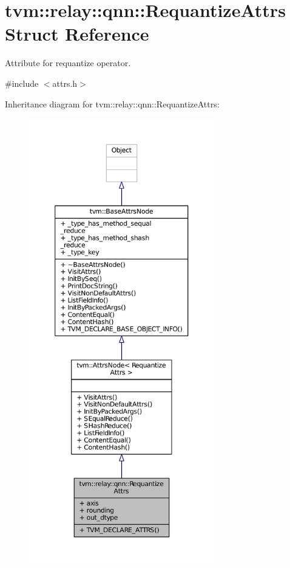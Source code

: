 \hypertarget{structtvm_1_1relay_1_1qnn_1_1RequantizeAttrs}{}\section{tvm\+:\+:relay\+:\+:qnn\+:\+:Requantize\+Attrs Struct Reference}
\label{structtvm_1_1relay_1_1qnn_1_1RequantizeAttrs}


Attribute for requantize operator.  




{\ttfamily \#include $<$attrs.\+h$>$}



Inheritance diagram for tvm\+:\+:relay\+:\+:qnn\+:\+:Requantize\+Attrs\+:
\nopagebreak
\begin{figure}[H]
\begin{center}
\leavevmode
\includegraphics[height=550pt]{structtvm_1_1relay_1_1qnn_1_1RequantizeAttrs__inherit__graph}
\end{center}
\end{figure}


